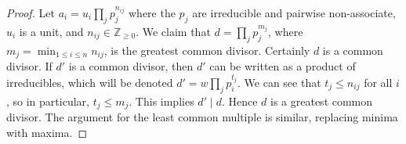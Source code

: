 \begin{proof}
	Let \( a_i = u_i \prod_j p_j^{n_{ij}} \) where the \( p_j \) are irreducible and pairwise non-associate, \( u_i \) is a unit, and \( n_{ij} \in \mathbb Z_{\geq 0} \).
	We claim that \( d = \prod_j p_j^{m_j} \), where \( m_j = \min_{1 \leq i \leq n} n_{ij} \), is the greatest common divisor.
	Certainly \( d \) is a common divisor.
	If \( d' \) is a common divisor, then \( d' \) can be written as a product of irreducibles, which will be denoted \( d' = w \prod_j p_i^{t_j} \).
	We can see that \( t_j \leq n_{ij} \) for all \( i \), so in particular, \( t_j \leq m_j \).
	This implies \( d' \mid d \).
	Hence \( d \) is a greatest common divisor.
	The argument for the least common multiple is similar, replacing minima with maxima.
\end{proof}

